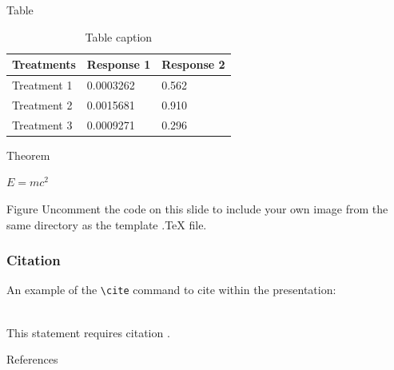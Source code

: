 \documentclass[aspectratio=169,xcolor=dvipsnames]{beamer}
\begin{document}
\begin{frame}{Table}
    \begin{table}
        \begin{tabular}{l l l}
            \toprule
            \textbf{Treatments} & \textbf{Response 1} & \textbf{Response 2} \\
            \midrule
            Treatment 1         & 0.0003262           & 0.562               \\
            Treatment 2         & 0.0015681           & 0.910               \\
            Treatment 3         & 0.0009271           & 0.296               \\
            \bottomrule
        \end{tabular}
        \caption{Table caption}
    \end{table}
\end{frame}


\begin{frame}{Theorem}
    \begin{theorem}
        $E = mc^2$
    \end{theorem}
\end{frame}


\begin{frame}{Figure}
    Uncomment the code on this slide to include your own image from the same directory as the template .TeX file.
\end{frame}


\begin{frame}[fragile] %
    \frametitle{Citation}
    An example of the \verb|\cite| command to cite within the presentation:\\~

    This statement requires citation \cite{p1}.
\end{frame}


\begin{frame}{References}
    \footnotesize
    
\end{frame}



\fi
\end{document}
